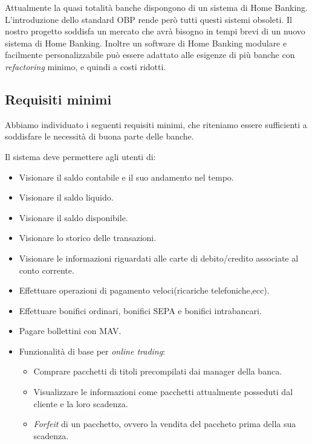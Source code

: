 \documentclass[10pt]{softeng} %
\begin{document}
Attualmente la quasi totalit\`a banche dispongono di un sistema di Home Banking.
L'introduzione dello standard OBP rende per\`o tutti questi sistemi obsoleti.
Il nostro progetto soddisfa un mercato che avr\`a bisogno in tempi brevi di un nuovo sistema di Home Banking.
Inoltre un software di Home Banking modulare e facilmente personalizzabile pu\`o essere adattato alle esigenze di pi\`u banche con \emph{refactoring} minimo, e quindi a costi ridotti.

\subsection{Requisiti minimi}

Abbiamo individuato i seguenti requisiti minimi, che riteniamo essere sufficienti a soddisfare le necessit\`a di buona parte delle banche.

Il sistema deve permettere agli utenti di:
\begin{itemize}
    \item Visionare il saldo contabile e il suo andamento nel tempo.
    \item Visionare il saldo liquido.
    \item Visionare il saldo disponibile.
    \item Visionare lo storico delle transazioni.
    \item Visionare le informazioni riguardati alle carte di debito/credito associate al conto corrente.
    \item Effettuare operazioni di pagamento veloci(ricariche telefoniche,ecc).
    \item Effettuare bonifici ordinari, bonifici SEPA e bonifici intrabancari.
    \item Pagare bollettini con MAV.
    \item Funzionalit\`a di base per \emph{online trading}:
        \begin{itemize}
            \item Comprare pacchetti di titoli precompilati dai manager della banca.
            \item Visualizzare le informazioni come pacchetti attualmente posseduti dal cliente e
                la loro scadenza.
            \item \emph{Forfeit} di un pacchetto, ovvero la vendita del paccheto prima della sua scadenza.
        \end{itemize}
\end{itemize}
\end{document}
